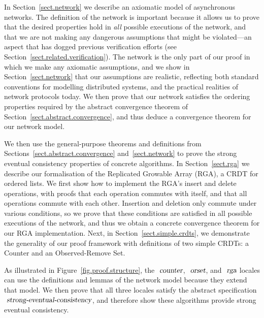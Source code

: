 In Section~\ref{sect.network} we describe an axiomatic model of asynchronous networks.
The definition of the network is important because it allows us to prove that the desired properties hold in \emph{all} possible executions of the network, and that we are not making any dangerous assumptions that might be violated---an aspect that has dogged previous verification efforts (see Section~\ref{sect.related.verification}).
The network is the only part of our proof in which we make any axiomatic assumptions, and we show in Section~\ref{sect.network} that our assumptions are realistic, reflecting both standard conventions for modelling distributed systems, and the practical realities of network protocols today.
We then prove that our network satisfies the ordering properties required by the abstract convergence theorem of Section~\ref{sect.abstract.convergence}, and thus deduce a convergence theorem for our network model.

We then use the general-purpose theorems and definitions from Sections~\ref{sect.abstract.convergence} and~\ref{sect.network} to prove the strong eventual consistency properties of concrete algorithms.
In Section~\ref{sect.rga} we describe our formalisation of the Replicated Growable Array (RGA), a CRDT for ordered lists.
We first show how to implement the RGA's insert and delete operations, with proofs that each operation commutes with itself, and that all operations commute with each other.
Insertion and deletion only commute under various conditions, so we prove that these conditions are satisfied in all possible executions of the network, and thus we obtain a concrete convergence theorem for our RGA implementation.
Next, in Section~\ref{sect.simple.crdts}, we demonstrate the generality of our proof framework with definitions of two simple CRDTs: a Counter and an Observed-Remove Set.

As illustrated in Figure~\ref{fig.proof.structure}, the $\isa{counter}$, $\isa{orset}$, and $\isa{rga}$ locales can use the definitions and lemmas of the network model because they extend that model.
We then prove that all three locales satisfy the abstract specification $\isa{strong-eventual-consistency}$, and therefore show these algorithms provide strong eventual consistency.

